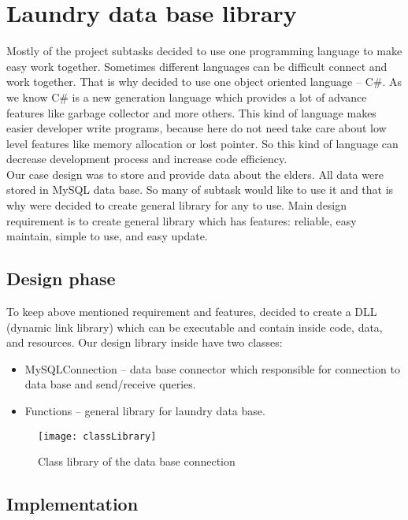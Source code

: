%
\section{Laundry data base library}

Mostly of the project subtasks decided to use one programming language to make easy work together. Sometimes different languages can be difficult connect and work together. That is why decided to use one object oriented language – C\#. As we know C\# is a new generation language which provides a lot of advance features like garbage collector and more others. This kind of language makes easier developer write programs, because here do not need take care about low level features like memory allocation or lost pointer. So this kind of language can decrease development process and increase code efficiency. \\
Our case design was to store and provide data about the elders. All data were stored in MySQL data base. So many of subtask would like to use it and that is why were decided to create general library for any to use. Main design requirement is to create general library which has features:  reliable, easy maintain, simple to use, and easy update.

\subsection{Design phase}

To keep above mentioned requirement and features, decided to create a DLL (dynamic link library) which can be executable and contain inside code, data, and resources. Our design library inside have two classes:

\begin{itemize}
	\item MySQLConnection – data base connector which responsible for connection to data base and send/receive queries.
	\item Functions – general library for laundry data base.
\end{itemize}

\begin{figure}[h]
	\centering
		\texttt{[image: classLibrary]}
	\caption{Class library of the data base connection}
	\label{fig:planning}
\end{figure}

\newpage
\subsection{Implementation}

